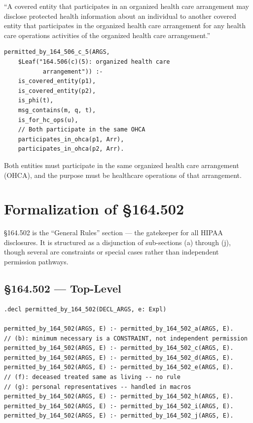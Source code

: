 \documentclass[11pt,letterpaper]{article}
\begin{document}
\begin{hipaabox}
``A covered entity that participates in an organized health care arrangement may disclose protected health information about an individual to another covered entity that participates in the organized health care arrangement for any health care operations activities of the organized health care arrangement.''
\end{hipaabox}

\begin{lstlisting}[style=soufflestyle,caption={\S 164.506(c)(5)}]
permitted_by_164_506_c_5(ARGS,
    $Leaf("164.506(c)(5): organized health care
           arrangement")) :-
    is_covered_entity(p1),
    is_covered_entity(p2),
    is_phi(t),
    msg_contains(m, q, t),
    is_for_hc_ops(u),
    // Both participate in the same OHCA
    participates_in_ohca(p1, Arr),
    participates_in_ohca(p2, Arr).
\end{lstlisting}

Both entities must participate in the same organized health care arrangement (OHCA), and the purpose must be healthcare operations of that arrangement.


\section{Formalization of \S 164.502}
\label{sec:502}

\S 164.502 is the ``General Rules'' section --- the gatekeeper for all HIPAA disclosures. It is structured as a disjunction of sub-sections (a) through (j), though several are constraints or special cases rather than independent permission pathways.

\subsection{\S 164.502 --- Top-Level}

\begin{lstlisting}[style=soufflestyle,caption={\S 164.502 top-level}]
.decl permitted_by_164_502(DECL_ARGS, e: Expl)

permitted_by_164_502(ARGS, E) :- permitted_by_164_502_a(ARGS, E).
// (b): minimum necessary is a CONSTRAINT, not independent permission
permitted_by_164_502(ARGS, E) :- permitted_by_164_502_c(ARGS, E).
permitted_by_164_502(ARGS, E) :- permitted_by_164_502_d(ARGS, E).
permitted_by_164_502(ARGS, E) :- permitted_by_164_502_e(ARGS, E).
// (f): deceased treated same as living -- no rule
// (g): personal representatives -- handled in macros
permitted_by_164_502(ARGS, E) :- permitted_by_164_502_h(ARGS, E).
permitted_by_164_502(ARGS, E) :- permitted_by_164_502_i(ARGS, E).
permitted_by_164_502(ARGS, E) :- permitted_by_164_502_j(ARGS, E).
\end{lstlisting}
\end{document}
